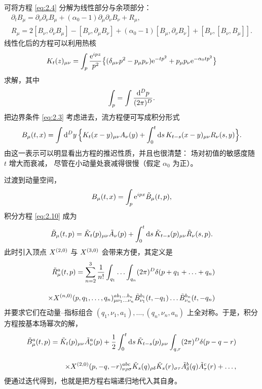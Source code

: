 可将方程 \eqref{eq:2.4} 分解为线性部分与余项部分：
\begin{align}
  \partial_tB_{\mu}=\partial_{\nu}\partial_{\nu}B_{\mu}
  +(\alpha_0-1)\partial_{\mu}\partial_{\nu}B_{\nu}+R_{\mu},
  \label{eq:2.6}\\[2pt]
  R_{\mu}=2[B_{\nu},\partial_{\nu}B_{\mu}]-
  [B_{\nu},\partial_{\mu}B_{\nu}]+(\alpha_0-1)[B_{\mu},\partial_{\nu}B_{\nu}]
  +[B_{\nu},[B_{\nu},B_{\mu}]].
  \label{eq:2.7}
\end{align}
线性化后的方程可以利用热核
\begin{equation}
  K_t(z)_{\mu\nu}=
  \int_p{\mathrm{e}^{ipz}\over p^2}\bigl\{
  (\delta_{\mu\nu}p^2-p_{\mu}p_{\nu})\mathrm{e}^{-tp^2}+
  p_{\mu}p_{\nu}\mathrm{e}^{-\alpha_0tp^2}\bigr\}
  \label{eq:2.8}
\end{equation}
求解，其中
\begin{equation}
  \int_p=\int{\mathrm{d}^Dp\over(2\pi)^D}.
  \label{eq:2.9}
\end{equation}
把边界条件 \eqref{eq:2.3} 考虑进去，流方程便可写成积分形式
\begin{equation}
  B_{\mu}(t,x)=\int\mathrm{d}^Dy\,\Bigl\{
  K_t(x-y)_{\mu\nu}A_{\nu}(y)
  +\int_0^t\mathrm{d} s\,K_{t-s}(x-y)_{\mu\nu}R_{\nu}(s,y)\Bigr\}.
  \label{eq:2.10}
\end{equation}
由这一表示可以明显看出方程的推迟性质，并且也很清楚：
场对初值的敏感度随 $t$ 增大而衰减，
尽管在小动量处衰减得很慢（假定 $\alpha_0$ 为正）。

过渡到动量空间，
\begin{equation}
  B_{\mu}(t,x)=\int_p\mathrm{e}^{ipx}\tilde{B}_{\mu}(t,p),
  \label{eq:2.11}
\end{equation}
积分方程 \eqref{eq:2.10} 成为
\begin{equation}
  \tilde{B}_{\mu}(t,p)=\tilde{K}_t(p)_{\mu\nu}\tilde{A}_{\nu}(p)+
  \int_0^t\mathrm{d} s\,\tilde{K}_{t-s}(p)_{\mu\nu}\tilde{R}_{\nu}(s,p).
  \label{eq:2.12}
\end{equation}
此时引入顶点 $X^{(2,0)}$ 与 $X^{(3,0)}$ 会带来方便，其定义是
\begin{align}
  \tilde{R}_{\mu}^a(t,p)=\sum_{n=2}^3
  {1\over n!}\int_{q_1}\ldots\int_{q_n}(2\pi)^D\delta(p+q_1+\ldots+q_n)
  \notag\\[2.5ex]
  \times X^{(n,0)}(p,q_1,\ldots,q_n)^{ab_1\ldots b_n}_{\mu\nu_1\ldots\nu_n}
  \tilde{B}^{b_1}_{\nu_1}(t,-q_1)\ldots\tilde{B}^{b_n}_{\nu_n}(t,-q_n)
  \label{eq:2.13}
\end{align}
并要求它们在动量--指标组合 $(q_1,\nu_1,a_1),\ldots,(q_n,\nu_n,a_n)$
上全对称。于是，积分方程按基本场幂次的解，
\begin{align}
  \tilde{B}_{\mu}^a(t,p)=\tilde{K}_t(p)_{\mu\nu}\tilde{A}_{\nu}^a(p)
  +\frac{1}{2}\int_0^t\mathrm{d} s\,\tilde{K}_{t-s}(p)_{\mu\nu}
  \int_{q,r}(2\pi)^D\delta(p-q-r)
  \notag\\[2.5ex]
  \times
  X^{(2,0)}(p,-q,-r)^{abc}_{\nu\rho\sigma}
  \tilde{K}_{s}(q)_{\rho\delta}\tilde{K}_{s}(r)_{\sigma\tau}
  \tilde{A}^b_{\delta}(q)\tilde{A}^c_{\tau}(r)+\ldots,
  \label{eq:2.14}
\end{align}
便通过迭代得到，也就是把方程右端递归地代入其自身。

